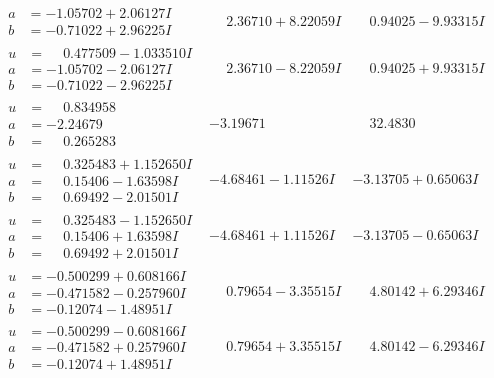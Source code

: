 \documentclass[1p]{elsarticle_modified}
\theoremstyle{definition}
\begin{document}
$$\begin{array}{c|c|c}
\begin{aligned}
a &= -1.05702 + 2.06127 I \\
b &= -0.71022 + 2.96225 I\end{aligned}
 & \phantom{-}2.36710 + 8.22059 I & \phantom{-}0.94025 - 9.93315 I \\ \hline\begin{aligned}
u &= \phantom{-}0.477509 - 1.033510 I \\
a &= -1.05702 - 2.06127 I \\
b &= -0.71022 - 2.96225 I\end{aligned}
 & \phantom{-}2.36710 - 8.22059 I & \phantom{-}0.94025 + 9.93315 I \\ \hline\begin{aligned}
u &= \phantom{-}0.834958\phantom{ +0.000000I} \\
a &= -2.24679\phantom{ +0.000000I} \\
b &= \phantom{-}0.265283\phantom{ +0.000000I}\end{aligned}
 & -3.19671\phantom{ +0.000000I} & \phantom{-}32.4830\phantom{ +0.000000I} \\ \hline\begin{aligned}
u &= \phantom{-}0.325483 + 1.152650 I \\
a &= \phantom{-}0.15406 - 1.63598 I \\
b &= \phantom{-}0.69492 - 2.01501 I\end{aligned}
 & -4.68461 - 1.11526 I & -3.13705 + 0.65063 I \\ \hline\begin{aligned}
u &= \phantom{-}0.325483 - 1.152650 I \\
a &= \phantom{-}0.15406 + 1.63598 I \\
b &= \phantom{-}0.69492 + 2.01501 I\end{aligned}
 & -4.68461 + 1.11526 I & -3.13705 - 0.65063 I \\ \hline\begin{aligned}
u &= -0.500299 + 0.608166 I \\
a &= -0.471582 - 0.257960 I \\
b &= -0.12074 - 1.48951 I\end{aligned}
 & \phantom{-}0.79654 - 3.35515 I & \phantom{-}4.80142 + 6.29346 I \\ \hline\begin{aligned}
u &= -0.500299 - 0.608166 I \\
a &= -0.471582 + 0.257960 I \\
b &= -0.12074 + 1.48951 I\end{aligned}
 & \phantom{-}0.79654 + 3.35515 I & \phantom{-}4.80142 - 6.29346 I \\ \hline\begin{aligned}

\end{aligned}
\end{array}$$
\end{document}
